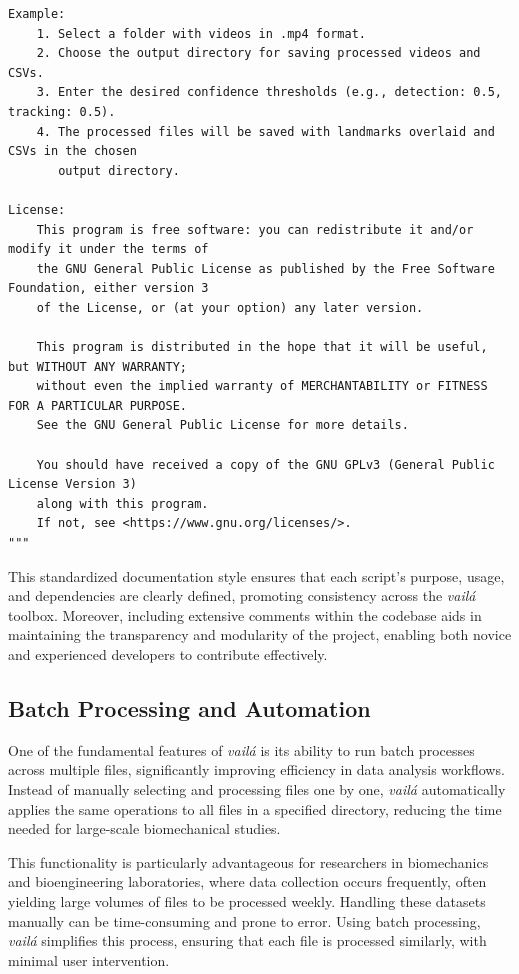 \documentclass{article}
\begin{document}
\begin{verbatim}
Example:
    1. Select a folder with videos in .mp4 format.
    2. Choose the output directory for saving processed videos and CSVs.
    3. Enter the desired confidence thresholds (e.g., detection: 0.5, tracking: 0.5).
    4. The processed files will be saved with landmarks overlaid and CSVs in the chosen 
       output directory.

License:
    This program is free software: you can redistribute it and/or modify it under the terms of 
    the GNU General Public License as published by the Free Software Foundation, either version 3 
    of the License, or (at your option) any later version.

    This program is distributed in the hope that it will be useful, but WITHOUT ANY WARRANTY; 
    without even the implied warranty of MERCHANTABILITY or FITNESS FOR A PARTICULAR PURPOSE. 
    See the GNU General Public License for more details.

    You should have received a copy of the GNU GPLv3 (General Public License Version 3) 
    along with this program. 
    If not, see <https://www.gnu.org/licenses/>.
"""
\end{verbatim}
\normalsize


This standardized documentation style ensures that each script's purpose, usage, and dependencies are clearly defined, promoting consistency across the \textit{vailá} toolbox. Moreover, including extensive comments within the codebase aids in maintaining the transparency and modularity of the project, enabling both novice and experienced developers to contribute effectively.

\subsection{Batch Processing and Automation}

One of the fundamental features of \textit{vailá} is its ability to run batch processes across multiple files, significantly improving efficiency in data analysis workflows. Instead of manually selecting and processing files one by one, \textit{vailá} automatically applies the same operations to all files in a specified directory, reducing the time needed for large-scale biomechanical studies.

This functionality is particularly advantageous for researchers in biomechanics and bioengineering laboratories, where data collection occurs frequently, often yielding large volumes of files to be processed weekly. Handling these datasets manually can be time-consuming and prone to error. Using batch processing, \textit{vailá} simplifies this process, ensuring that each file is processed similarly, with minimal user intervention. 
\end{document}
